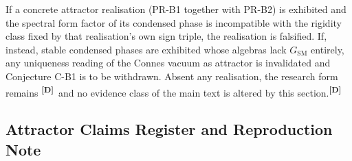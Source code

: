 \documentclass[12pt,a4paper,twoside]{article}
\theoremstyle{plain}
\theoremstyle{definition}
\theoremstyle{remark}
\newcommand{\catmark}[1]{\textsuperscript{\textsf{\textbf{[#1]}}}}
\begin{document}
\begin{killswitch}
If a concrete attractor realisation (PR-B1 together with PR-B2) is
exhibited and the spectral form factor of its condensed phase is
incompatible with the rigidity class fixed by that realisation's own sign
triple, the realisation is falsified. If, instead, stable condensed
phases are exhibited whose algebras lack $G_{\mathrm{SM}}$ entirely, any
uniqueness reading of the Connes vacuum as attractor is invalidated and
Conjecture C-B1 is to be withdrawn. Absent any realisation, the research
form remains \catmark{D}\ and no evidence class of the main text is
altered by this section.\catmark{D}
\end{killswitch}

\subsection{Attractor Claims Register and Reproduction Note}
\label{subsec:attractor-claims}
\end{document}
